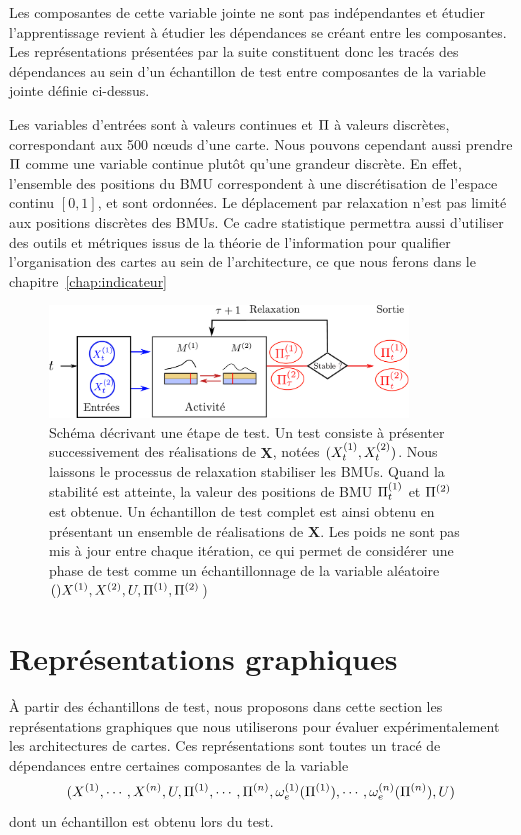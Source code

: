 \documentclass[../main]{subfiles}
\begin{document}
Les composantes de cette variable jointe ne sont pas indépendantes et étudier l'apprentissage revient à étudier les dépendances se créant entre les composantes.
Les représentations présentées par la suite constituent donc les tracés des dépendances au sein d'un échantillon de test entre composantes de la variable jointe définie ci-dessus.

Les variables d'entrées sont à valeurs continues et $\Pi$ à valeurs discrètes, correspondant aux 500 n\oe{}uds d'une carte. 
Nous pouvons cependant aussi prendre $\Pi$ comme une variable continue plutôt qu'une grandeur discrète. 
En effet, l'ensemble des positions du BMU correspondent à une discrétisation de l'espace continu $[0,1]$, et sont ordonnées. Le déplacement par relaxation n'est pas limité aux positions discrètes des BMUs.
Ce cadre statistique permettra aussi d'utiliser des outils et métriques issus de la théorie de l'information pour qualifier l'organisation des cartes au sein de l'architecture, ce que nous ferons dans le chapitre~\ref{chap:indicateur}

\begin{figure}
\centering
\includegraphics[width=0.85\textwidth]{tests_2maps.pdf}
\caption{Schéma décrivant une étape de test. Un test consiste à présenter successivement des réalisations de $\mathbf{X}$, notées $(X^{({1})}_t,X^{({2})}_t)$. Nous laissons le processus de relaxation stabiliser les BMUs. Quand la stabilité est atteinte, la valeur des positions de BMU $\Pi^{({1})}_t$ et $\Pi^{({2})}$ est obtenue. Un échantillon de test complet est ainsi obtenu en présentant un ensemble de réalisations de $\mathbf{X}$. Les poids ne sont pas mis à jour entre chaque itération, ce qui permet de considérer une phase de test comme un échantillonnage de la variable aléatoire $()X^{({1})},X^{({2})}, U, \Pi^{({1})}, \Pi^{({2})}$) }
\label{fig:flowchart}
\end{figure}

\section{Représentations graphiques}

\`A partir des échantillons de test, nous proposons dans cette section les représentations graphiques que nous utiliserons pour évaluer expérimentalement les architectures de cartes.
Ces représentations sont toutes un tracé de dépendances entre certaines composantes de la variable $$(X^{({1})}, \cdots, X^{({n})}, U, \Pi^{({1})}, \cdots, \Pi^{({n})}, \omega_e^{({1})}(\Pi^{({1})}), \cdots, \omega_e^{({n})}(\Pi^{({n})}),U)$$ dont un échantillon est obtenu lors du test.
\end{document}
